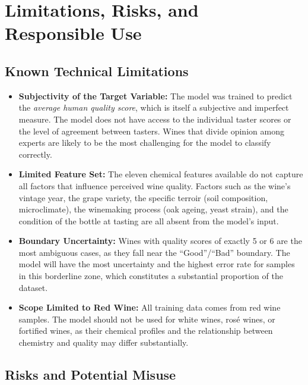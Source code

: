 \documentclass[11pt,a4paper]{article}
\begin{document}
\section{Limitations, Risks, and Responsible Use}

\subsection{Known Technical Limitations}

\begin{itemize}[leftmargin=*]
    \item \textbf{Subjectivity of the Target Variable:} The model was trained to predict the \textit{average human quality score}, which is itself a subjective and imperfect measure. The model does not have access to the individual taster scores or the level of agreement between tasters. Wines that divide opinion among experts are likely to be the most challenging for the model to classify correctly.

    \item \textbf{Limited Feature Set:} The eleven chemical features available do not capture all factors that influence perceived wine quality. Factors such as the wine's vintage year, the grape variety, the specific terroir (soil composition, microclimate), the winemaking process (oak ageing, yeast strain), and the condition of the bottle at tasting are all absent from the model's input.

    \item \textbf{Boundary Uncertainty:} Wines with quality scores of exactly 5 or 6 are the most ambiguous cases, as they fall near the ``Good''/``Bad'' boundary. The model will have the most uncertainty and the highest error rate for samples in this borderline zone, which constitutes a substantial proportion of the dataset.

    \item \textbf{Scope Limited to Red Wine:} All training data comes from red wine samples. The model should not be used for white wines, ros\'{e} wines, or fortified wines, as their chemical profiles and the relationship between chemistry and quality may differ substantially.
\end{itemize}

\subsection{Risks and Potential Misuse}
\end{document}
